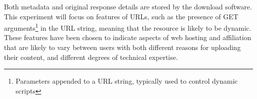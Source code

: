 



Both metadata and original response details are stored by the download software.  This experiment will focus on features of URLs, such as the presence of GET arguments\footnote{Parameters appended to a URL string, typically used to control dynamic scripts}
in the URL string, meaning that the resource is likely to be dynamic.  These features have been chosen to indicate aspects of web hosting and affiliation that are likely to vary between users with both different reasons for uploading their content, and different degrees of technical expertise.



